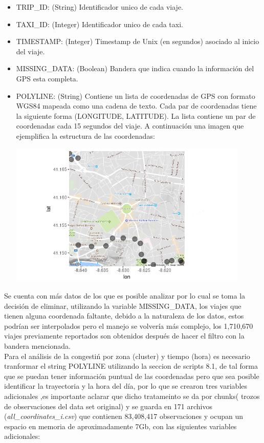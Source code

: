 \documentclass[a4paper]{article}
\begin{document}
\begin{itemize}
\item TRIP\_ID: (String) Identificador unico de cada viaje.
\item TAXI\_ID: (Integer) Identificador unico de cada taxi.
\item TIMESTAMP: (Integer) Timestamp de Unix (en segundos) asociado al inicio del viaje.
\item MISSING\_DATA: (Boolean) Bandera que indica cuando la información del GPS esta completa.
\item POLYLINE: (String) Contiene un lista de coordenadas de  GPS  con formato WGS84 mapeada como una cadena de texto. Cada par de coordenadas tiene la siguiente forma (LONGITUDE, LATITUDE). La lista contiene un par de coordenadas cada 15 segundos del viaje. A continuación una imagen que ejemplifica la estructura de las coordenadas: 
\begin{center}
\includegraphics[width=0.9\textwidth]{mapa3.png}
\end{center}

\end{itemize}

\noindent
Se cuenta con m\'as datos de los que es posible analizar por lo cual se toma la decisión de eliminar, utilizando la variable MISSING\_DATA, los viajes que tienen alguna coordenada faltante, debido a la naturaleza de los datos, estos podrían ser interpolados pero el manejo se volvería m\'as complejo, los 1,710,670 viajes previamente reportados son obtenidos después de hacer el filtro con la bandera mencionada.\\

\noindent
Para el an\'alisis de la congesti\'n por zona (cluster) y tiempo (hora) es necesario tranformar el string POLYLINE utilizando la seccion de scripts 8.1, de tal forma que se puedan tener información puntual de las coordenadas pero que sea posible identificar la trayectoria y la hora del d\'ia, por lo que se crearon tres variables adicionales ,es importante aclarar que dicho tratameinto se da por chunks( trozos de observaciones del data set original) y se guarda en 171 archivos (\textit{all\_coordinates\_i.csv}) que contienen 83,408,417 observaciones y ocupan un espacio en memoria de aproximadamente 7Gb, con las siguientes variables adicionales:\\
\end{document}
